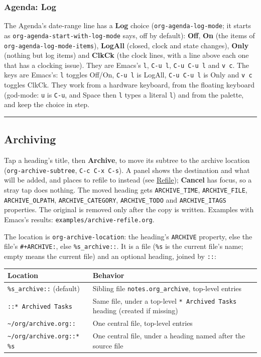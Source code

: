 \documentclass[11pt]{article}
\begin{document}
\subsubsection{Agenda: Log}
\label{sec:org0592be4}

The Agenda's date-range line has a \textbf{Log} choice (\texttt{org-agenda-log-mode}; it starts as \texttt{org-agenda-start-with-log-mode} says, off by default): \textbf{Off}, \textbf{On} (the items of \texttt{org-agenda-log-mode-items}), \textbf{LogAll} (closed, clock and state changes), \textbf{Only} (nothing but log items) and \textbf{ClkCk} (the clock lines, with a line above each one that has a clocking issue). They are Emacs's \texttt{l}, \texttt{C-u l}, \texttt{C-u C-u l} and \texttt{v c}. The keys are Emacs's: \texttt{l} toggles Off/On, \texttt{C-u l} is LogAll, \texttt{C-u C-u l} is Only and \texttt{v c} toggles ClkCk. They work from a hardware keyboard, from the floating keyboard (god-mode: \texttt{u} is \texttt{C-u}, and Space then \texttt{l} types a literal \texttt{l}) and from the palette, and keep the choice in step.

\noindent\rule{\textwidth}{0.5pt}

\subsection{Archiving}
\label{sec:orgf736f7c}
Tap a heading's title, then \textbf{Archive}, to move its subtree to the archive location (\texttt{org-archive-subtree}, \texttt{C-c C-x C-s}). A panel shows the destination and what will be added, and places to refile to instead (see \hyperref[sec:orgf424d46]{Refile}); \textbf{Cancel} has focus, so a stray tap does nothing. The moved heading gets \texttt{ARCHIVE\_TIME}, \texttt{ARCHIVE\_FILE}, \texttt{ARCHIVE\_OLPATH}, \texttt{ARCHIVE\_CATEGORY}, \texttt{ARCHIVE\_TODO} and \texttt{ARCHIVE\_ITAGS} properties. The original is removed only after the copy is written. Examples with Emacs's results: \texttt{examples/archive-refile.org}.

The location is \texttt{org-archive-location}: the heading's \texttt{ARCHIVE} property, else the file's \texttt{\#+ARCHIVE:}, else \texttt{\%s\_archive::}. It is a file (\texttt{\%s} is the current file's name; empty means the current file) and an optional heading, joined by \texttt{::}:

\begin{center}
\begin{tabular}{ll}
Location & Behavior\\[0pt]
\hline
\texttt{\%s\_archive::} (default) & Sibling file \texttt{notes.org\_archive}, top-level entries\\[0pt]
\texttt{::* Archived Tasks} & Same file, under a top-level \texttt{* Archived Tasks} heading (created if missing)\\[0pt]
\texttt{\textasciitilde{}/org/archive.org::} & One central file, top-level entries\\[0pt]
\texttt{\textasciitilde{}/org/archive.org::* \%s} & One central file, under a heading named after the source file\\[0pt]
\end{tabular}
\end{center}
\end{document}
